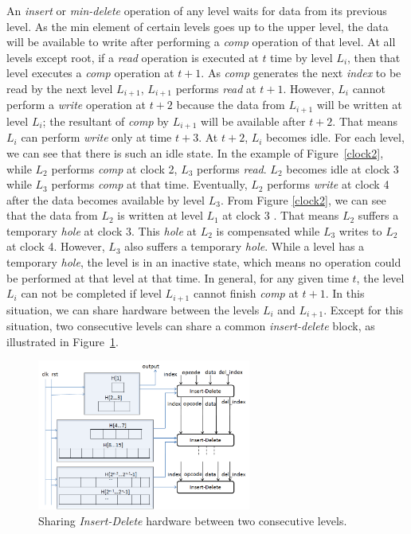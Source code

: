 \documentclass[10pt, conference, compsocconf]{IEEEtran}
\begin{document}
An {\it insert} or {\it min-delete} operation of any level waits for data from its previous level.
As the min element of certain levels goes up to the upper level, the data will be available to write after performing a {\it comp} operation of that level.
At all levels except root, if a {\it read} operation is executed at $t$ time by level $L_i$, then that level executes a {\it comp} operation at $t+1$.
As {\it comp} generates the next {\it index} to be read by the next level $L_{i+1}$, $L_{i+1}$ performs {\it read} at $t+1$.
However, $L_i$ cannot perform a {\it write} operation at $t+2$ because the data from $L_{i+1}$ will be written at level $L_i$; the resultant of {\it comp} by $L_{i+1}$ will be available after $t+2$.
That means $L_i$ can perform {\it write} only at time $t+3$.
At $t+2$, $L_i$ becomes idle.
For each level, we can see that there is such an idle state.
In the example of Figure~\ref{clock2}, while $L_2$ performs {\it comp} at clock 2, $L_3$ performs {\it read}.
$L_2$ becomes idle at clock 3 while $L_3$ performs {\it comp} at that time.
Eventually, $L_2$ performs {\it write} at clock 4 after the data becomes available by level $L_3$.
From Figure \ref{clock2}, we can see that the data from $L_2$ is written at level $L_1$ at clock 3 .
That means $L_2$ suffers a temporary {\it hole} at clock 3.
This {\it hole} at $L_2$ is compensated while $L_3$ writes to $L_2$ at clock 4.
However, $L_3$ also suffers a temporary {\it hole}.
While a level has a temporary {\it hole}, the level is in an inactive state, which means no operation could be performed at that level at that time.
In general, for any given time $t$, the level $L_i$ can not be completed if level $L_{i+1}$ cannot finish {\it comp} at $t+1$.
In this situation, we can share hardware between the levels $L_i$ and $L_{i+1}$.
Except for this situation, two consecutive levels can share a common {\it insert-delete} block, as illustrated in Figure~\ref{d3}.

\begin{figure}[!ht]
  \centering
  \includegraphics[width=7cm]{Figures/d3.png}
      \caption{Sharing {\it Insert-Delete} hardware between two consecutive levels.}
    \label{d3}
\end{figure}
\end{document}
